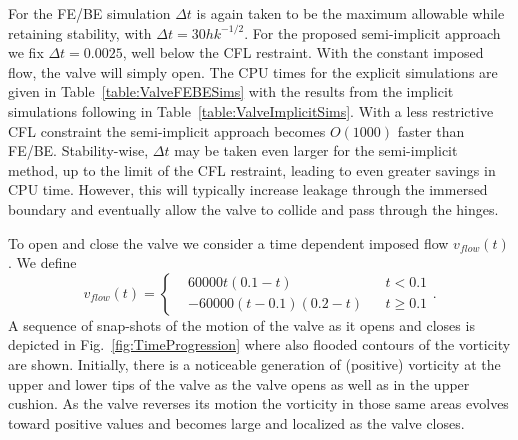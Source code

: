 For the FE/BE simulation $\Delta t$ is again taken to be the maximum allowable while retaining stability, with $\Delta t = 30h k^{-1/2}$. For the proposed semi-implicit approach we fix $\Delta t=0.0025$, well below the CFL restraint. 
With the
constant imposed flow, the valve will simply open. The CPU times for the explicit simulations are given in Table~\ref{table:ValveFEBESims} with the results from the implicit simulations following in 
Table~\ref{table:ValveImplicitSims}. With a less restrictive CFL constraint the semi-implicit approach becomes $O(1000)$
faster than FE/BE. Stability-wise,  $\Delta t$ may be taken even larger for the semi-implicit method,  up to the limit of the CFL restraint, leading to even greater savings in CPU time. However, this will typically increase leakage through the immersed boundary and eventually allow the valve to collide and pass through the hinges.

To open and close the valve we consider a time dependent imposed flow $v_{flow}(t)$.
We define
\begin{equation}
v_{flow}(t) =
\left\{
\begin{array}{cccc}
&60000t(0.1-t)& &t<0.1 \\
&-60000(t-0.1)(0.2-t)& &t\geq 0.1
\end{array}
\right. .
\label{eqn:VariableFlow}
\end{equation}
A sequence of snap-shots of the motion of the valve as it opens and closes is depicted in Fig.~\ref{fig:TimeProgression}
where also flooded contours of the vorticity are shown. Initially, there is a noticeable generation of (positive) vorticity at the upper and lower tips of the valve as the valve opens as well as in the upper cushion. As the valve reverses its motion the vorticity in those same
areas evolves toward positive values and becomes large and localized as the valve closes. 
 


